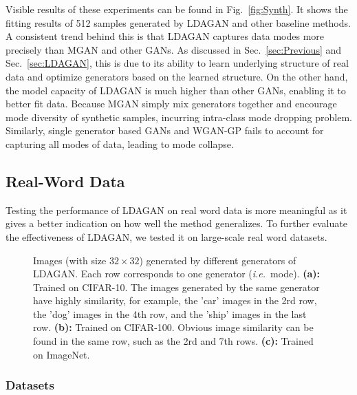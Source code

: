 \documentclass{article}
\def\ie{\emph{i.e.}}
\begin{document}
Visible results of these experiments can be found in Fig.~\ref{fig:Synth}.
It shows the fitting results of 512 samples generated by LDAGAN and other baseline methods.
A consistent trend behind this is that LDAGAN captures data modes more precisely than MGAN and other GANs.
As discussed in Sec.~\ref{sec:Previous} and Sec.~\ref{sec:LDAGAN}, this is due to its ability to learn underlying structure of real data and optimize generators based on the learned structure.
On the other hand, the model capacity of LDAGAN is much higher than other GANs, enabling it to better fit data.
Because MGAN simply mix generators together and encourage mode diversity of synthetic samples, incurring intra-class mode dropping problem.
Similarly, single generator based GANs and WGAN-GP fails to account for capturing all modes of data, leading to mode collapse.


\subsection{Real-Word Data}

Testing the performance of LDAGAN on real word data is more meaningful as it gives a better indication on how well the method generalizes.
To further evaluate the effectiveness of LDAGAN, we tested it on large-scale real word datasets.

\begin{figure*}
  \centering
    \hspace{.15in}
    \hspace{.15in}
     \caption{Images (with size $32\times32$) generated by different generators of LDAGAN. Each row corresponds to one generator (\ie~mode). \textbf{(a):} Trained on CIFAR-10. The images generated by the same generator have highly similarity, for example, the 'car' images in the 2rd row, the 'dog' images in the 4th row, and the 'ship' images in the last row.  \textbf{(b):} Trained on CIFAR-100. Obvious image similarity can be found in the same row, such as the 2rd and 7th rows. \textbf{(c):} Trained on ImageNet.}
     \label{fig:Struc}
\end{figure*}

\subsubsection{Datasets}
\label{sec:Datasets}
\end{document}

